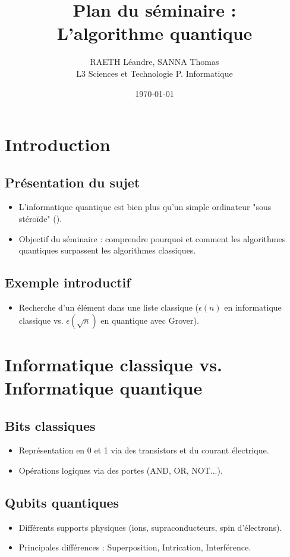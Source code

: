 \documentclass{article}
\title{Plan du séminaire :\\L'algorithme quantique}
\author{RAETH Léandre, SANNA Thomas\\L3 Sciences et Technologie  P. Informatique}
\date{\today}
\begin{document}
\maketitle

\section{Introduction}
\subsection{Présentation du sujet}
\begin{itemize}
    \item L'informatique quantique est bien plus qu'un simple ordinateur "sous stéroïde" (\cite{V2F_2024}).
    \item Objectif du séminaire : comprendre pourquoi et comment les algorithmes quantiques surpassent les algorithmes classiques.
\end{itemize}
\subsection{Exemple introductif}
\begin{itemize}
    \item Recherche d'un élément dans une liste classique (\(\epsilon(n)\) en informatique classique vs. \(\epsilon(\sqrt{n})\) en quantique avec Grover).
\end{itemize}

\section{Informatique classique vs. Informatique quantique}
\subsection{Bits classiques}
\begin{itemize}
    \item Représentation en 0 et 1 via des transistors et du courant électrique.
    \item Opérations logiques via des portes (AND, OR, NOT...).
\end{itemize}
\subsection{Qubits quantiques}
\begin{itemize}
    \item Différents supports physiques (ions, supraconducteurs, spin d'électrons).
    \item Principales différences : Superposition, Intrication, Interférence.
\end{itemize}
\end{document}
